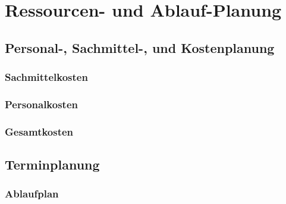 \chapter{Ressourcen- und Ablauf-Planung}

\section{Personal-, Sachmittel-, und Kostenplanung}

\subsection{Sachmittelkosten}

\FloatBarrier
\subsection{Personalkosten}
 \FloatBarrier
\subsection{Gesamtkosten}

\newpage
\section{Terminplanung}

\subsection{Ablaufplan}

